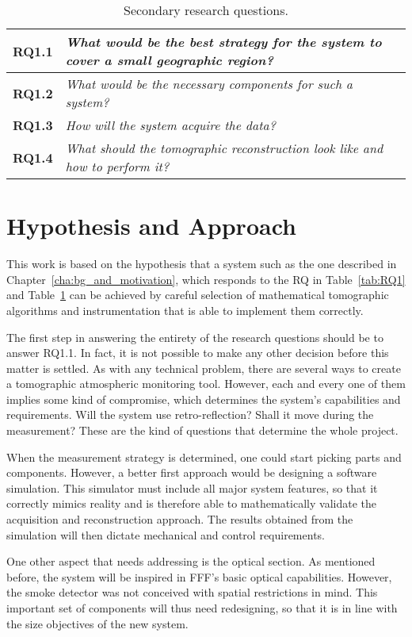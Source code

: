 \begin{table}[htpb]
    \centering
    \caption{Secondary research questions.}
    \label{tab:sec_RQ}
    \begin{tabularx}{0.8\textwidth}{cX}
        \toprule
        \textbf{RQ1.1}&\emph{ What would be the best strategy
        for the system to cover a small geographic region? }\\
        \midrule
        \textbf{RQ1.2}&\emph{ What would be the necessary
        components for such a system? }\\
        \midrule
        \textbf{RQ1.3}&\emph{ How will the system acquire the
        data? }\\
        \midrule
        \textbf{RQ1.4}&\emph{ What should the tomographic
        reconstruction look like and how to perform it? }\\
        \bottomrule
    \end{tabularx}
\end{table}



\section{Hypothesis and Approach}%
\label{sec:hypothesis_and_approach}

This work is based on the hypothesis that a system such as the one
described in Chapter~\ref{cha:bg_and_motivation}, which responds to the
\gls{RQ} in Table~\ref{tab:RQ1} and Table~\ref{tab:sec_RQ} can be
achieved by careful selection of mathematical tomographic algorithms and
instrumentation that is able to implement them correctly.

The first step in answering the entirety of the research questions
should be to answer RQ1.1. In fact, it is not possible to make any other
decision before this matter is settled. As with any technical problem,
there are several ways to create a tomographic atmospheric monitoring
tool. However, each and every one of them implies some kind of
compromise, which determines the system's capabilities and requirements.
Will the system use retro-reflection? Shall it move during the
measurement? These are the kind of questions that determine the whole
project.

When the measurement strategy is determined, one could start picking
parts and components. However, a better first approach would be
designing a software simulation. This simulator must include all major
system features, so that it correctly mimics reality and is therefore
able to mathematically validate the acquisition and reconstruction
approach. The results obtained from the simulation will then dictate
mechanical and control requirements.

One other aspect that needs addressing is the optical section. As
mentioned before, the system will be inspired in \gls{FFF}'s basic
optical capabilities. However, the smoke detector was not conceived with
spatial restrictions in mind. This important set of components will thus
need redesigning, so that it is in line with the size objectives of the
new system.
